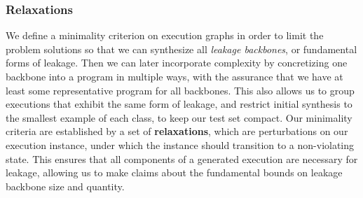 \subsubsection{Relaxations}
We define a minimality criterion on execution graphs in order to limit the problem solutions so that we can synthesize all \textit{leakage backbones}, or fundamental forms of leakage. Then we can later incorporate complexity by concretizing one backbone into a program in multiple ways, with the assurance that we have at least some representative program for all backbones. This also allows us to group executions that exhibit the same form of leakage, and restrict initial synthesis to the smallest example of each class, to keep our test set compact.
Our minimality criteria are established by a set of \textbf{relaxations}, which are perturbations on our execution instance, under which the instance should transition to a non-violating state. This ensures that all components of a generated execution are necessary for leakage, allowing us to make claims about the fundamental bounds on leakage backbone size and quantity.
\urgentbr
{}
\notebr

